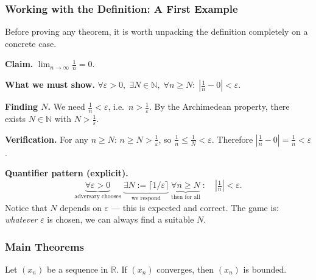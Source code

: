 \subsubsection{Working with the Definition: A First Example}

Before proving any theorem, it is worth unpacking the definition completely
on a concrete case.

\begin{tcolorbox}[colback=gray!6, colframe=gray!40, arc=2pt,
  left=6pt, right=6pt, top=4pt, bottom=4pt,
  title={\small\textbf{Example: Verifying $x_n = 1/n \to 0$ from the $\varepsilon$-definition}},
  fonttitle=\small\bfseries]
\textbf{Claim.} $\displaystyle\lim_{n\to\infty}\frac{1}{n} = 0$.

\medskip
\textbf{What we must show.}
$\forall \varepsilon > 0,\; \exists N \in \mathbb{N},\; \forall n \ge N:\;
\left|\frac{1}{n} - 0\right| < \varepsilon$.

\medskip
\textbf{Finding $N$.}
We need $\tfrac{1}{n} < \varepsilon$, i.e.\ $n > \tfrac{1}{\varepsilon}$.
By the Archimedean property, there exists $N \in \mathbb{N}$ with
$N > \tfrac{1}{\varepsilon}$.

\medskip
\textbf{Verification.}
For any $n \ge N$: $n \ge N > \tfrac{1}{\varepsilon}$, so
$\tfrac{1}{n} \le \tfrac{1}{N} < \varepsilon$.
Therefore $\left|\tfrac{1}{n} - 0\right| = \tfrac{1}{n} < \varepsilon$. \checkmark

\medskip
\textbf{Quantifier pattern (explicit).}
\[
\underbrace{\forall \varepsilon > 0}_{\text{adversary chooses}}\;
\underbrace{\exists N := \lceil 1/\varepsilon \rceil}_{\text{we respond}}\;
\underbrace{\forall n \ge N}_{\text{then for all}}\;:
\quad \left|\tfrac{1}{n}\right| < \varepsilon.
\]
Notice that $N$ depends on $\varepsilon$ --- this is expected and correct.
The game is: \emph{whatever} $\varepsilon$ is chosen, we can always find a
suitable $N$.
\end{tcolorbox}

\subsubsection{Main Theorems}

\begin{theorem}
Let $(x_n)$ be a sequence in $\mathbb{R}$.  
If $(x_n)$ converges, then $(x_n)$ is bounded.
\end{theorem}



